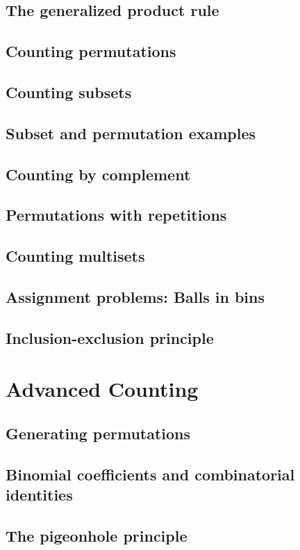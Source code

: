 \documentclass{article}
\begin{document}
\subsection{The generalized product rule}
\subsection{Counting permutations}
\subsection{Counting subsets}
\subsection{Subset and permutation examples}
\subsection{Counting by complement}
\subsection{Permutations with repetitions}
\subsection{Counting multisets}
\subsection{Assignment problems: Balls in bins}
\subsection{Inclusion-exclusion principle}

\section{Advanced Counting}
\subsection{Generating permutations}
\subsection{Binomial coefficients and combinatorial identities}
\subsection{The pigeonhole principle}
\end{document}
